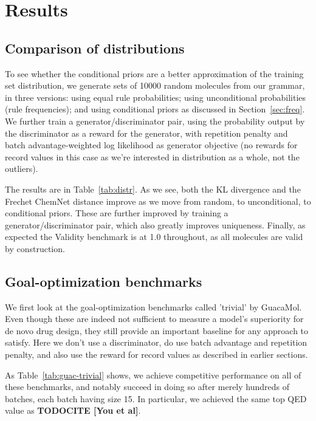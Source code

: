 \documentclass{article}
\newcommand{\CITE}[1]{{\bf TODOCITE [#1]}}
\begin{document}
\section{Results}\label{sec:results}
\subsection{Comparison of distributions}
To see whether the conditional priors are a better approximation of the training set distribution, we generate sets of 10000 random molecules from our grammar, in three versions: using equal rule probabilities; using unconditional probabilities (rule frequencies); and using conditional priors as discussed in Section~\ref{sec:freq}. We further train a generator/discriminator pair, using the probability output by the discriminator as a reward for the generator, with repetition penalty and batch advantage-weighted log likelihood as generator objective (no rewards for record values in this case as we're interested in distribution as a whole, not the outliers).

The results are in Table~\ref{tab:distr}. As we see, both the KL divergence and the Frechet ChemNet distance improve as we move from random, to unconditional, to conditional priors. These are further improved by training a generator/discriminator pair, which also greatly improves uniqueness. Finally, as expected the Validity benchmark is at 1.0 throughout, as all molecules are valid by construction.

\subsection{Goal-optimization benchmarks}
We first look at the goal-optimization benchmarks called 'trivial' by GuacaMol. Even though these are indeed not sufficient to measure a model's superiority for de novo drug design, they still provide an important baseline for any approach to satisfy.
Here we don't use a discriminator, do use batch advantage and repetition penalty, and also use the reward for record values as described in earlier sections.

As Table~\ref{tab:guac-trivial} shows, we achieve competitive performance on all of these benchmarks, and notably succeed in doing so after merely hundreds of batches, each batch having size 15. In particular, we achieved the same top QED value as \CITE{You et al}.
\end{document}
